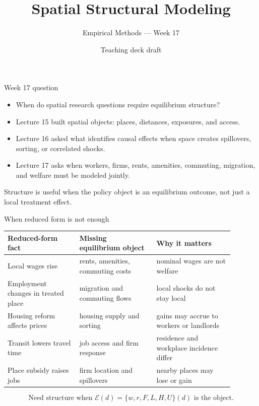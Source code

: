\documentclass[aspectratio=169,11pt]{beamer}
\title{Spatial Structural Modeling}
\subtitle{Empirical Methods --- Week 17}
\author{Teaching deck draft}
\date{}
\newcommand{\1}{\mathbf{1}}
\begin{document}
\begin{frame}
  \titlepage
\end{frame}

\begin{frame}{Week 17 question}
\begin{itemize}
    \item When do spatial research questions require equilibrium structure?
    \item Lecture 15 built spatial objects: places, distances, exposures, and access.
    \item Lecture 16 asked what identifies causal effects when space creates spillovers, sorting, or correlated shocks.
    \item Lecture 17 asks when workers, firms, rents, amenities, commuting, migration, and welfare must be modeled jointly.
\end{itemize}

\medskip
Structure is useful when the policy object is an equilibrium outcome, not just a local treatment effect.
\end{frame}

\begin{frame}{When reduced form is not enough}
\small
\begin{tabular}{p{0.29\linewidth} p{0.30\linewidth} p{0.30\linewidth}}
\toprule
Reduced-form fact & Missing equilibrium object & Why it matters \\
\midrule
Local wages rise & rents, amenities, commuting costs & nominal wages are not welfare \\
Employment changes in treated place & migration and commuting flows & local shocks do not stay local \\
Housing reform affects prices & housing supply and sorting & gains may accrue to workers or landlords \\
Transit lowers travel time & job access and firm response & residence and workplace incidence differ \\
Place subsidy raises jobs & firm location and spillovers & nearby places may lose or gain \\
\bottomrule
\end{tabular}

\medskip
\[
\text{Need structure when } \mathcal{E}(d)
=
\{w,r,F,L,H,U\}(d)
\text{ is the object.}
\]
\end{frame}
\end{document}
